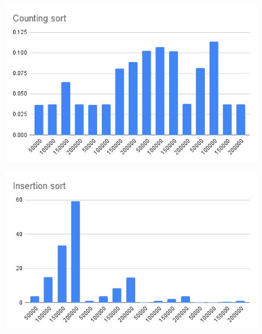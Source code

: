 \begin{minipage}{0.5\textwidth}
    \begin{figure}[H]
        \centering
        \includegraphics[width=1.0\textwidth]{graphics/Counting_sort.png}
    \end{figure}
\end{minipage}
\begin{minipage}{0.5\textwidth}
    \begin{figure}[H]
        \centering
        \includegraphics[width=1.0\textwidth]{graphics/Insertion_sort.png}
    \end{figure}
\end{minipage}
